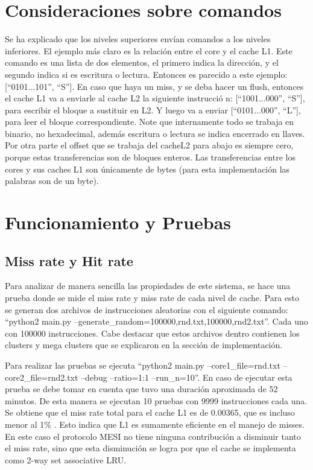 \documentclass {article}
\begin{document}
\section{Consideraciones sobre comandos}
Se ha explicado que los niveles superiores envían comandos a los niveles inferiores. El ejemplo más
claro es la relación entre el core y el cache L1. Este comando es una lista de dos elementos, el
primero indica la dirección, y el segundo indica si es escritura o lectura. Entonces es parecido a
este ejemplo: [``0101...101'', ``{S}'']. En caso que haya un miss, y se deba hacer un flush, entonces el
cache L1 va a enviarle al cache L2 la siguiente instrucci\'o n: [``1001...000'', ``{S}''], para escribir
el bloque a sustituir en L2. Y luego va a enviar [``0101...000'', ``{L}''], para leer el bloque
correspondiente. Note que internamente todo se trabaja en binario, no hexadecimal, además escritura
o lectura se indica encerrado en llaves. Por otra parte el offset que se trabaja del cacheL2 para
abajo es siempre cero, porque estas transferencias son de bloques enteros. Las transferencias entre
los cores y sus caches L1 son únicamente de bytes (para esta implementación las palabras son de un byte). 


\section{Funcionamiento y Pruebas}

\subsection{Miss rate y Hit rate}

Para analizar de manera sencilla las propiedades de este sistema, se hace una prueba donde se mide
el miss rate y miss rate de cada nivel de cache. Para esto se generan dos archivos de instrucciones
aleatorias con el siguiente comando: ``python2 main.py
--generate\_random=100000,rnd.txt,100000,rnd2.txt''. Cada uno con 100000 instrucciones. Cabe destacar
que estos archivos dentro contienen los clusters y mega clusters que se explicaron en la sección de
implementación. 


Para realizar las pruebas se ejecuta ``python2 main.py --core1\_file=rnd.txt --core2\_file=rnd2.txt
--debug --ratio=1:1 --run\_n=10''. En caso de ejecutar esta prueba se debe tomar en cuenta que tuvo
una duración aproximada de 52 minutos. De esta manera se ejecutan 10 pruebas con 9999 instrucciones cada
una. Se obtiene que el miss rate total para el cache L1 es de 0.00365, que es incluso menor al 1\%
. Esto indica que L1 es sumamente eficiente en el manejo de misses. En este caso el protocolo MESI
no tiene ninguna contribución a disminuir tanto el miss rate, sino que esta disminución se logra por
que el cache se implementa como 2-way set associative LRU. 
\end{document}
